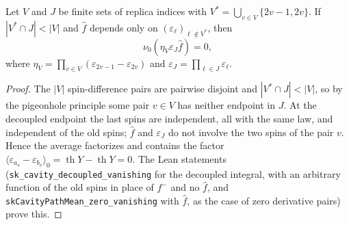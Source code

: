 \begin{lemma}\label{lem:sg-tal:decoupled-eta-vanishing}
\leanok
{}
Let $V$ and $J$ be finite sets of replica indices with $V^* = \bigcup_{v \in V} \{2v-1, 2v\}$.
If $|V^* \cap J| < |V|$ and $\hat f$ depends only on $(\varepsilon_\ell)_{\ell \notin V^*}$, then
\[
\nu_0(\eta_V \varepsilon_J \hat f) = 0,
\]
where $\eta_V = \prod_{v \in V} (\varepsilon_{2v-1} - \varepsilon_{2v})$ and $\varepsilon_J = \prod_{\ell \in J} \varepsilon_\ell$.
\end{lemma}
\begin{proof}
\leanok
The $|V|$ spin-difference pairs are pairwise disjoint and $|V^*\cap J|<|V|$, so by the pigeonhole principle some pair $v\in V$ has neither endpoint in $J$.
At the decoupled endpoint the last spins are independent, all with the same law, and independent of the old spins; $\hat f$ and $\varepsilon_J$ do not involve the two spins of the pair $v$.
Hence the average factorizes and contains the factor $\langle\varepsilon_{a_v}-\varepsilon_{b_v}\rangle_0=\operatorname{th}Y-\operatorname{th}Y=0$.
The Lean statements (\texttt{sk\_cavity\_decoupled\_vanishing} for the decoupled integral, with an arbitrary function of the old spins in place of $f^-$ and no $\hat f$,
and \texttt{skCavityPathMean\_zero\_vanishing} with $\hat f$, as the case of zero derivative pairs) prove this.
\end{proof}

